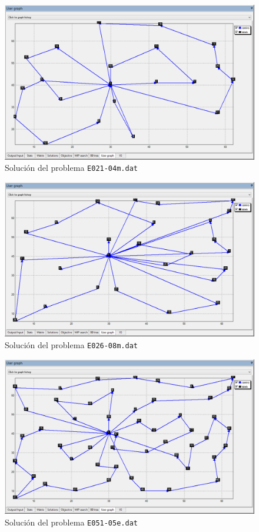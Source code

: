 \documentclass[a4paper,11pt]{article}
\begin{document}
\begin{figure}[!htbp]
	\centering
	\includegraphics[width=1.0\textwidth]{e021_clarke_wright.png}
    \caption{Solución del problema \texttt{E021-04m.dat}}
\end{figure}

\begin{figure}[!htbp]
	\centering
	\includegraphics[width=1.0\textwidth]{e026_clarke_wright.png}
    \caption{Solución del problema \texttt{E026-08m.dat}}
\end{figure}

\begin{figure}[!htbp]
	\centering
	\includegraphics[width=1.0\textwidth]{e051_clarke_wright.png}
    \caption{Solución del problema \texttt{E051-05e.dat}}
\end{figure}
\end{document}
